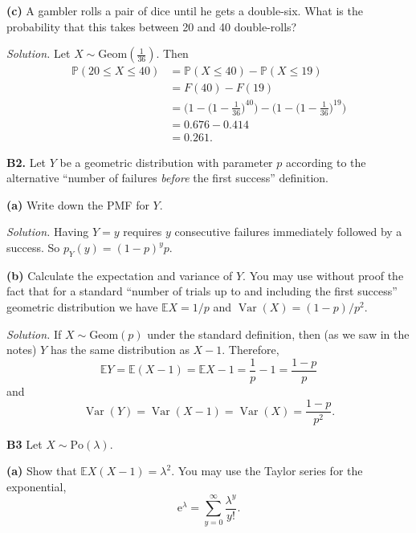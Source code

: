 \documentclass[
  a4paper,
]{book}
\theoremstyle{definition}
\theoremstyle{definition}
\theoremstyle{definition}
\theoremstyle{definition}
\theoremstyle{remark}
\begin{document}
\textbf{(c)} A gambler rolls a pair of dice until he gets a double-six. What is the probability that this takes between 20 and 40 double-rolls?

\begin{myanswers}
\emph{Solution.}
Let \(X \sim \text{Geom}(\frac{1}{36})\). Then
\begin{align*}
\mathbb P(20 \leq X \leq 40) &= \mathbb P(X \leq 40) - \mathbb P(X \leq 19) \\
  &= F(40) - F(19) \\
  &= \bigg(1 - \big(1 - \tfrac{1}{36})^{40}\bigg) - \bigg(1 - \big(1 - \tfrac{1}{36})^{19}\bigg) \\
  &= 0.676 - 0.414 \\
  &= 0.261.
\end{align*}

\end{myanswers}

\textbf{B2.} Let \(Y\) be a geometric distribution with parameter \(p\) according to the alternative ``number of failures \emph{before} the first success'' definition.

\textbf{(a)} Write down the PMF for \(Y\).

\begin{myanswers}
\emph{Solution.} Having \(Y = y\) requires \(y\) consecutive failures immediately followed by a success. So \(p_Y(y) = (1-p)^y p\).

\end{myanswers}

\textbf{(b)} Calculate the expectation and variance of \(Y\). You may use without proof the fact that for a standard ``number of trials up to and including the first success'' geometric distribution we have \(\mathbb EX = 1/p\) and \(\operatorname{Var}(X) = (1-p)/p^2\).

\begin{myanswers}
\emph{Solution.} If \(X \sim \text{Geom}(p)\) under the standard definition, then (as we saw in the notes) \(Y\) has the same distribution as \(X -1\). Therefore,
\[ \mathbb EY = \mathbb E(X-1) = \mathbb EX - 1 = \frac{1}{p} - 1 = \frac{1-p}{p} \]
and
\[ \operatorname{Var}(Y) = \operatorname{Var}(X -1) = \operatorname{Var}(X) = \frac{1-p}{p^2} .  \]

\end{myanswers}

\textbf{B3} Let \(X \sim \text{Po}(\lambda)\).

\textbf{(a)} Show that \(\mathbb EX(X-1) = \lambda^2\). You may use the Taylor series for the exponential,
\[ \mathrm{e}^\lambda = \sum_{y=0}^\infty \frac{\lambda^y}{y!} . \]
\end{document}
